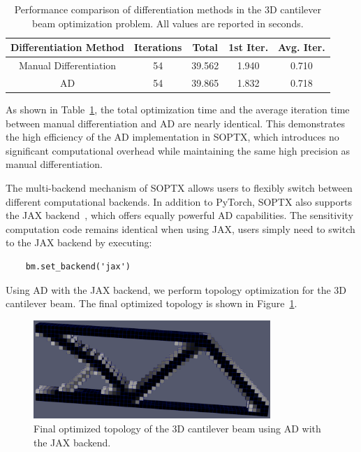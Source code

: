 \documentclass[mathpazo]{cicp}
\begin{document}
\begin{table}[htbp]
	\centering
	\caption{Performance comparison of differentiation methods in the 3D cantilever beam optimization problem. All values are reported in seconds.}
	\begin{tabular}{ccccc}
		\toprule
		\textbf{Differentiation Method} & \textbf{Iterations} & \textbf{Total} & \textbf{1st Iter.} & \textbf{Avg. Iter.} \\
		\midrule
		Manual Differentiation & 54 & 39.562 & 1.940 & 0.710 \\
		AD & 54 & 39.865 & 1.832 & 0.718 \\
		\bottomrule
	\end{tabular}
	\label{tab:ad_vs_manual}
\end{table}

As shown in Table~\ref{tab:ad_vs_manual}, the total optimization time and the average iteration time between manual differentiation and AD are nearly identical. This demonstrates the high efficiency of the AD implementation in SOPTX, which introduces no significant computational overhead while maintaining the same high precision as manual differentiation.

The multi-backend mechanism of SOPTX allows users to flexibly switch between different computational backends. In addition to PyTorch, SOPTX also supports the JAX backend~\cite{bradbury2018jax}, which offers equally powerful AD capabilities. The sensitivity computation code remains identical when using JAX, users simply need to switch to the JAX backend by executing:
\begin{lstlisting}
	bm.set_backend('jax')
\end{lstlisting}

Using AD with the JAX backend, we perform topology optimization for the 3D cantilever beam. The final optimized topology is shown in Figure~\ref{fig:canti3d_ad_jax}.

\begin{figure}[htp] 
	\centering 
	\includegraphics[width=0.8\textwidth]{figures/cantilever_3d_auto_jax.png} \caption{Final optimized topology of the 3D cantilever beam using AD with the JAX backend.} \label{fig:canti3d_ad_jax} 
\end{figure}
\end{document}

